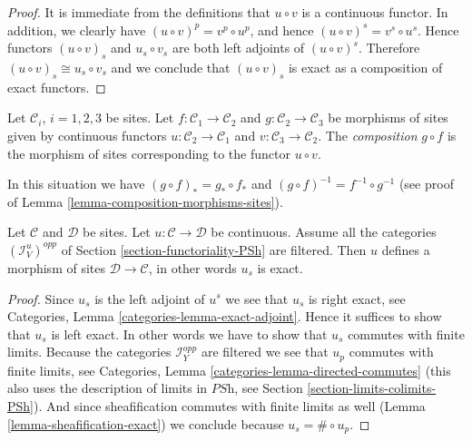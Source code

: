 \begin{proof}
It is immediate from the definitions that $u \circ v$ is a continuous functor.
In addition, we clearly have $(u \circ v)^p = v^p \circ u^p$, and hence
$(u \circ v)^s = v^s \circ u^s$. Hence functors $(u \circ v)_s$  and
$u_s \circ v_s$ are both left adjoints of $(u \circ v)^s$. Therefore
$(u \circ v)_s \cong u_s \circ v_s$ and we conclude that $(u \circ v)_s$
is exact as a composition of exact functors.
\end{proof}

\begin{definition}
\label{definition-composition-morphisms-sites}
Let $\mathcal{C}_i$, $i = 1, 2, 3$ be sites. Let
$f : \mathcal{C}_1 \to \mathcal{C}_2$ and
$g : \mathcal{C}_2 \to \mathcal{C}_3$ be morphisms of sites
given by continuous functors $u : \mathcal{C}_2 \to \mathcal{C}_1$
and $v : \mathcal{C}_3 \to \mathcal{C}_2$. The {\it composition}
$g \circ f$ is the morphism of sites corresponding to the
functor $u \circ v$.
\end{definition}

\noindent
In this situation we have $(g \circ f)_* = g_* \circ f_*$ and
$(g \circ f)^{-1} = f^{-1} \circ g^{-1}$ (see proof of
Lemma \ref{lemma-composition-morphisms-sites}).

\begin{lemma}
\label{lemma-directed-morphism}
Let $\mathcal{C}$ and $\mathcal{D}$ be sites. Let
$u : \mathcal{C} \to \mathcal{D}$ be continuous.
Assume all the categories $(\mathcal{I}_V^u)^{opp}$ of
Section \ref{section-functoriality-PSh}
are filtered. Then $u$ defines a morphism of sites $\mathcal{D} \to
\mathcal{C}$, in other words $u_s$ is exact.
\end{lemma}

\begin{proof}
Since $u_s$ is the left adjoint of $u^s$ we see that $u_s$ is right
exact, see Categories, Lemma \ref{categories-lemma-exact-adjoint}.
Hence it suffices to show that $u_s$ is left exact. In other words
we have to show that $u_s$ commutes with finite limits.
Because the categories $\mathcal{I}_Y^{opp}$ are filtered
we see that $u_p$ commutes with finite limits, see
Categories, Lemma \ref{categories-lemma-directed-commutes}
(this also uses the description of limits in $\textit{PSh}$,
see Section \ref{section-limits-colimits-PSh}).
And since sheafification commutes with finite limits as well
(Lemma \ref{lemma-sheafification-exact}) we conclude because
$u_s = \# \circ u_p$.
\end{proof}

